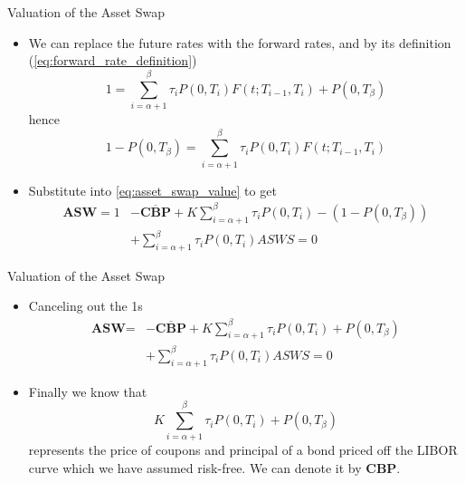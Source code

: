 \documentclass{beamer}
\begin{document}
\begin{frame}{Valuation of the Asset Swap}
	\begin{itemize}
		\item We can replace the future rates with the forward rates, and by its definition (\cref{eq:forward_rate_definition})
		\begin{equation*}
			1 = \sum_{i=\alpha+1}^{\beta}\tau_i P(0,T_i)F(t;T_{i-1},T_i)+P(0,T_\beta)
		\end{equation*}
		hence 
		\begin{equation*}
			1 - P(0,T_\beta) = \sum_{i=\alpha+1}^{\beta}\tau_i P(0,T_i)F(t;T_{i-1},T_i)
		\end{equation*}
		\item Substitute into \cref{eq:asset_swap_value} to get
		\begin{equation*}
			\begin{aligned}
				\textbf{ASW}=1&-\overline{\textbf{CBP}}+K\sum_{i=\alpha+1}^{\beta}\tau_i P(0,T_i) -(1-P(0,T_\beta)) \\
				&+ \sum_{i=\alpha+1}^{\beta}\tau_i P(0,T_i)ASWS=0
			\end{aligned}
		\end{equation*}
	\end{itemize}
\end{frame}

\begin{frame}{Valuation of the Asset Swap}
	\begin{itemize}
		\item Canceling out the 1s
		\begin{equation*}
			\begin{aligned}
				\textbf{ASW}=&-\overline{\textbf{CBP}}+K\sum_{i=\alpha+1}^{\beta}\tau_i P(0,T_i) +P(0,T_\beta) \\
				& + \sum_{i=\alpha+1}^{\beta}\tau_i P(0,T_i)ASWS=0
			\end{aligned}
		\end{equation*}
		\item Finally we know that
		\begin{equation*}
			K\sum_{i=\alpha+1}^{\beta}\tau_i P(0,T_i) + P(0,T_\beta)
		\end{equation*}
		represents the price of coupons and principal of a bond priced off the LIBOR curve which we have assumed risk-free. We can denote it by \textbf{CBP}.
	\end{itemize}
\end{frame}
\end{document}
